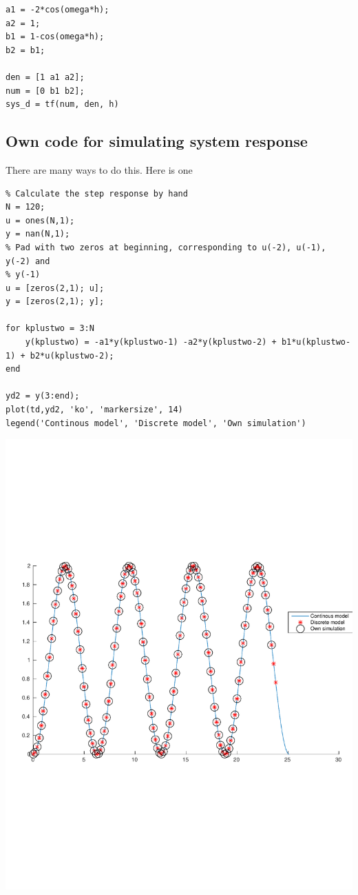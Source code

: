 \documentclass{scrartcl}
\begin{document}
\begin{verbatim}
a1 = -2*cos(omega*h);
a2 = 1;
b1 = 1-cos(omega*h);
b2 = b1;

den = [1 a1 a2];
num = [0 b1 b2];
sys_d = tf(num, den, h)
\end{verbatim}
\subsection*{Own code for simulating system response}
\label{sec-2-3}

   There are many ways to do this. Here is one

\begin{verbatim}
% Calculate the step response by hand
N = 120;
u = ones(N,1);
y = nan(N,1);
% Pad with two zeros at beginning, corresponding to u(-2), u(-1), y(-2) and
% y(-1)
u = [zeros(2,1); u];
y = [zeros(2,1); y];

for kplustwo = 3:N
    y(kplustwo) = -a1*y(kplustwo-1) -a2*y(kplustwo-2) + b1*u(kplustwo-1) + b2*u(kplustwo-2);
end

yd2 = y(3:end);
plot(td,yd2, 'ko', 'markersize', 14)
legend('Continous model', 'Discrete model', 'Own simulation')
\end{verbatim}

\begin{center}
\includegraphics[width=0.7\linewidth]{hw2-spring16-sim}
\end{center}
\end{document}
